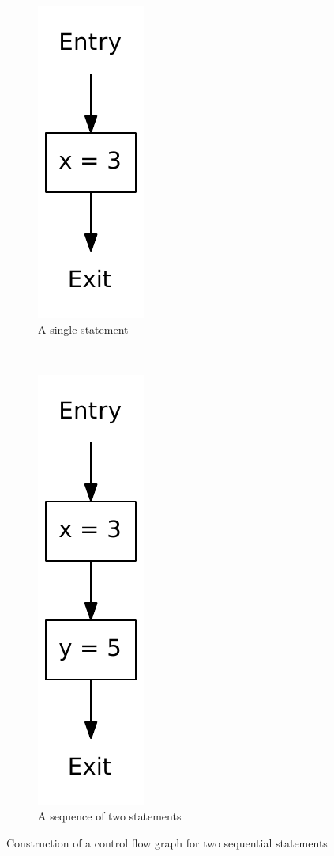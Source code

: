 \begin{figure}
  \begin{subfigure}[b]{0.49\textwidth}
    \center
    \includegraphics[scale=0.5]{figures/simple.pdf}
    \caption{A single statement}
  \end{subfigure}
  ~
  \begin{subfigure}[b]{0.49\textwidth}
    \center
    \includegraphics[scale=0.5]{figures/sequence.pdf}
    \caption{A sequence of two statements}
  \end{subfigure}
  \caption{Construction of a control flow graph for two sequential statements}
  \label{cfg_sequence}
\end{figure}


